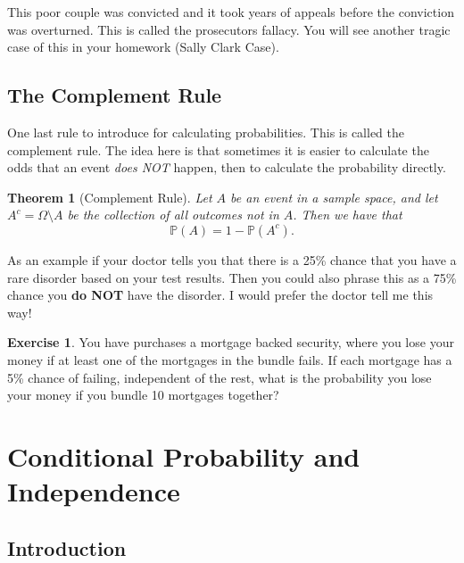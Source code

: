 \documentclass[
]{book}
\newcommand{\prob}[1]{{\mathbb{P}(#1)}}
\newtheorem{theorem}{Theorem}[chapter]
\theoremstyle{definition}
\theoremstyle{definition}
\theoremstyle{definition}
\newtheorem{exercise}{Exercise}[chapter]
\theoremstyle{definition}
\theoremstyle{remark}
\begin{document}
This poor couple was convicted and it took years of appeals before the conviction was overturned. This is called the prosecutors fallacy. You will see another tragic case of this in your homework (Sally Clark Case).

\hypertarget{the-complement-rule}{%
\subsection{The Complement Rule}\label{the-complement-rule}}

One last rule to introduce for calculating probabilities. This is called the complement rule. The idea here is that sometimes it is easier to calculate the odds that an event \emph{does NOT} happen, then to calculate the probability directly.

\begin{theorem}[Complement Rule]
\protect\hypertarget{thm:unnamed-chunk-232}{}\label{thm:unnamed-chunk-232}Let \(A\) be an event in a sample space, and let \(A^c=\Omega \setminus A\) be the collection of all outcomes not in \(A\). Then we have that \[\prob{A}=1-\prob{A^c}.\]
\end{theorem}

As an example if your doctor tells you that there is a 25\% chance that you have a rare disorder based on your test results. Then you could also phrase this as a 75\% chance you \textbf{do NOT} have the disorder. I would prefer the doctor tell me this way!

\begin{exercise}
\protect\hypertarget{exr:unnamed-chunk-233}{}\label{exr:unnamed-chunk-233}You have purchases a mortgage backed security, where you lose your money if at least one of the mortgages in the bundle fails. If each mortgage has a 5\% chance of failing, independent of the rest, what is the probability you lose your money if you bundle 10 mortgages together?
\end{exercise}

\hypertarget{conditional-probability-and-independence}{%
\section{Conditional Probability and Independence}\label{conditional-probability-and-independence}}

\hypertarget{introduction-1}{%
\subsection{Introduction}\label{introduction-1}}
\end{document}
